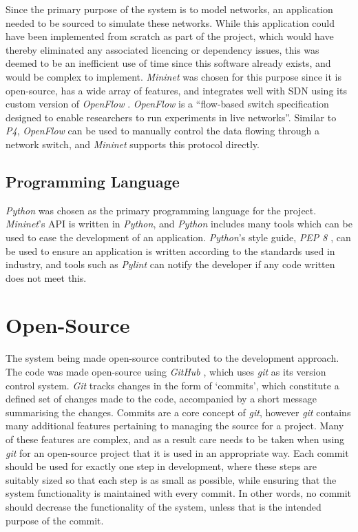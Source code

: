 Since the primary purpose of the system is to model networks, an application needed to be sourced to simulate these networks.
While this application could have been implemented from scratch as part of the project, which would have thereby eliminated any associated licencing or dependency issues, this was deemed to be an inefficient use of time since this software already exists, and would be complex to implement.
\textit{Mininet} was chosen for this purpose since it is open-source, has a wide array of features, and integrates well with SDN using its custom version of \textit{OpenFlow} \cite{mininet_openflow}.
\textit{OpenFlow} is a ``flow-based switch specification designed to enable researchers to run experiments in live networks''.
Similar to \textit{P4}, \textit{OpenFlow} can be used to manually control the data flowing through a network switch, and \textit{Mininet} supports this protocol directly.

\subsection{Programming Language}

\textit{Python} \cite{python} was chosen as the primary programming language for the project.
\textit{Mininet}'s API is written in \textit{Python}, and \textit{Python} includes many tools which can be used to ease the development of an application.
\textit{Python}'s style guide, \textit{PEP 8} \cite{python_pep8}, can be used to ensure an application is written according to the standards used in industry, and tools such as \textit{Pylint} can notify the developer if any code written does not meet this.

\section{Open-Source}
\label{open_source}

The system being made open-source contributed to the development approach.
The code was made open-source using \textit{GitHub} \cite{github}, which uses \textit{git} \cite{git} as its version control system.
\textit{Git} tracks changes in the form of `commits', which constitute a defined set of changes made to the code, accompanied by a short message summarising the changes.
Commits are a core concept of \textit{git}, however \textit{git} contains many additional features pertaining to managing the source for a project.
Many of these features are complex, and as a result care needs to be taken when using \textit{git} for an open-source project that it is used in an appropriate way.
Each commit should be used for exactly one step in development, where these steps are suitably sized so that each step is as small as possible, while ensuring that the system functionality is maintained with every commit.
In other words, no commit should decrease the functionality of the system, unless that is the intended purpose of the commit.


